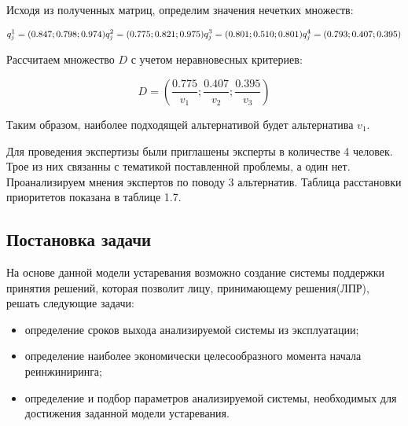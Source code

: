 
Исходя из полученных матриц, определим значения нечетких множеств:

\begin{equation}
    q^1_j=(0.847;0.798;0.974) \\
    q^2_j=(0.775;0.821;0.975) \\
    q^3_j=(0.801;0.510;0.801) \\
    q^4_j=(0.793;0.407;0.395) \\
\end{equation}

Рассчитаем множество $D$ с учетом неравновесных критериев:

\begin{equation}
    D=(\frac{0.775}{v_1};\frac{0.407}{v_2};\frac{0.395}{v_3})
\end{equation}

Таким образом, наиболее подходящей альтернативой будет альтернатива $v_1$.

Для проведения экспертизы были приглашены эксперты в количестве 4 человек. Трое из них связанны с тематикой поставленной проблемы, а один нет.
Проанализируем мнения экспертов по поводу 3 альтернатив. Таблица расстановки приоритетов показана в таблице 1.7. 

\subsection{Постановка задачи}
На основе данной модели устаревания возможно создание системы поддержки принятия решений, которая позволит лицу, принимающему решения(ЛПР), решать следующие задачи:
\begin{itemize}
    \item определение сроков выхода анализируемой системы из эксплуатации;
    \item определение наиболее экономически целесообразного момента начала реинжиниринга;
    \item определение и подбор параметров анализируемой системы, необходимых для достижения заданной модели устаревания.
\end{itemize}

